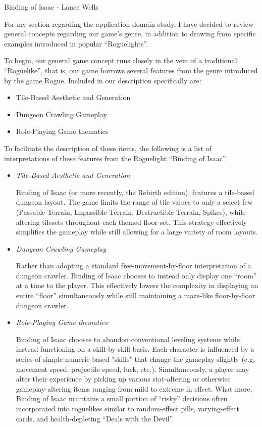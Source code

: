 \documentclass[12pt]{report}
\begin{document}
\begin{section}{Binding of Isaac - Lance Wells}

For my section regarding the application domain study, I have decided to
review general concepts regarding our game's genre, in addition to drawing
from specific examples introduced in popular ``Roguelights''.

To begin, our general game concept runs closely in the vein of a
traditional ``Roguelike'', that is, our game borrows several features from
the genre introduced by the game Rogue. Included in our description
specifically are:

\begin{itemize}
\item Tile-Based Aesthetic and Generation
\item Dungeon Crawling Gameplay
\item Role-Playing Game thematics
\end{itemize}

To facilitate the description of these items, the following is a list of
interpretations of these features from the Roguelight ``Binding of Isaac''.

\begin{itemize}
\item \emph{Tile-Based Aesthetic and Generation}

Binding of Isaac (or more recently, the Rebirth edition), features a
tile-based dungeon layout. The game limits the range of tile-values to only
a select few (Passable Terrain, Impassible Terrain, Destructible Terrain,
Spikes), while altering tilesets throughout each themed floor set. This
strategy effectively simplifies the gameplay while still allowing for a
large variety of room layouts.

\item	\emph{Dungeon Crawling Gameplay}

Rather than adopting a standard free-movement-by-floor interpretation of a
dungeon crawler. Binding of Isaac chooses to instead only display one
``room'' at a time to the player. This effectively lowers the complexity in
displaying an entire ``floor'' simultaneously while still maintaining a
maze-like floor-by-floor dungeon crawler.

\item	\emph{Role-Playing Game thematics}

Binding of Isaac chooses to abandon conventional leveling systems while
instead functioning on a skill-by-skill basis. Each character is influenced
by a series of simple numeric-based "skills" that change the gameplay
slightly (e.g. movement speed, projectile speed, luck, etc.).
Simultaneously, a player may alter their experience by picking up various
stat-altering or otherwise gameplay-altering items ranging from mild to
extreme in effect. What more, Binding of Isaac maintains a small portion of
``risky'' decisions often incorporated into roguelikes similar to
random-effect pills, varying-effect  cards, and health-depleting ``Deals
with the Devil''.
\end{itemize}
\end{section}
\end{document}
